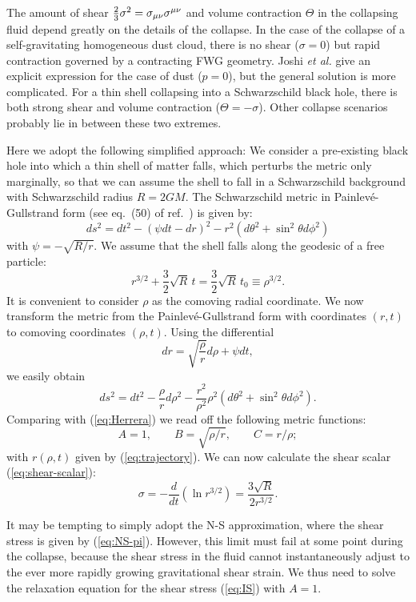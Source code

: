 \documentclass[article,twocolumn]{revtex4}
\newcommand{\be}{\begin{equation}}
\newcommand{\ee}{\end{equation}}
\begin{document}
The amount of shear ${2\over 3}\sigma^2 = \sigma_{\mu\nu}\sigma^{\mu\nu}$ and volume contraction $\Theta$ in the collapsing fluid depend greatly on the details of the collapse. In the case of the collapse of a self-gravitating homogeneous dust cloud, there is no shear ($\sigma=0$) but rapid contraction governed by a contracting FWG geometry. Joshi {\em et al.} \cite{Joshi:2001xi} give an explicit expression for the case of dust ($p=0$), but the general solution is more complicated. For a thin shell collapsing into a Schwarzschild black hole, there is both strong shear and volume contraction ($\Theta=-\sigma$). Other collapse scenarios probably lie in between these two extremes. 

Here we adopt the following simplified approach: We consider a pre-existing black hole into which a thin shell of matter falls, which perturbs the metric only marginally, so that we can assume the shell to fall in a Schwarzschild background with Schwarzschild radius $R = 2GM$. The Schwarzschild metric in Painlev\'e-Gullstrand form (see eq.~(50) of ref.~\cite{Adler:2005vn}) is given by:
\be 
ds^2 = dt^2 - (\psi dt - dr)^2 - r^2 (d\theta^2 + \sin^2\theta d\phi^2)
\ee
with $\psi = - \sqrt{R/r}$. We assume that the shell falls along the geodesic of a free particle:
\be
r^{3/2} + \frac{3}{2}\sqrt{R}\,t = \frac{3}{2}\sqrt{R}\,t_0 \equiv \rho^{3/2} .
\label{eq:trajectory}
\ee
It is convenient to consider $\rho$ as the comoving radial coordinate. We now transform the metric from the Painlev\'e-Gullstrand form with coordinates $(r,t)$ to comoving coordinates $(\rho,t)$. Using the differential
\be
dr = \sqrt{\frac{\rho}{r}} d\rho +\psi dt ,
\ee
we easily obtain
\be
ds^2 = dt^2 - \frac{\rho}{r} d\rho^2 - \frac{r^2}{\rho^2} \rho^2 (d\theta^2 + \sin^2\theta d\phi^2) .
\label{eq:metric}
\ee
Comparing with (\ref{eq:Herrera}) we read off the following metric functions:
\be
A=1, \qquad B = \sqrt{\rho/r}, \qquad C = r/\rho ;
\ee
with $r(\rho,t)$ given by (\ref{eq:trajectory}). We can now calculate the shear scalar (\ref{eq:shear-scalar}):
\be
\sigma = - \frac{d}{dt} ( \ln r^{3/2} ) = \frac{3\sqrt{R}}{2r^{3/2}} .
\label{eq:sigma}
\ee

It may be tempting to simply adopt the N-S approximation, where the shear stress is given by (\ref{eq:NS-pi}). However, this limit must fail at some point during the collapse, because the shear stress in the fluid cannot instantaneously adjust to the ever more rapidly growing gravitational shear strain. We thus need to solve the relaxation equation for the shear stress (\ref{eq:IS}) with $A=1$.
 
\end{document}
